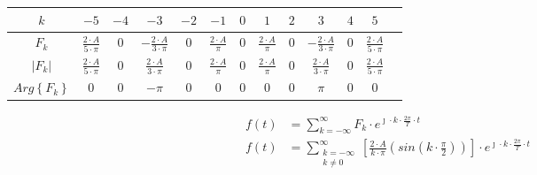 \begin{task}
\begin{table}[H]
    \centering  
    \begin{tabular}{|c|c|c|c|c|c|c|c|c|c|c|c|c|}
        \hline 
        $k$ & $-5$ & $-4$ & $-3$ & $-2$ & $-1$ & $0$ & $1$ & $2$ & $3$ & $4$ & $5$\\ 
        \hline 
        $F_k$ & $\frac{2\cdot A}{5 \cdot \pi}$ & $0$ & $-\frac{2\cdot A}{3 \cdot \pi}$ & $0$ & $\frac{2\cdot A}{\pi}$ & $0$ & $\frac{2\cdot A}{\pi}$ & $0$ & $-\frac{2 \cdot A}{3 \cdot \pi}$ & $0$ & $\frac{2\cdot A}{5 \cdot \pi}$\\ 
        \hline 
        $\left| F_k \right|$ & $\frac{2\cdot A}{5 \cdot \pi}$ & $0$ & $\frac{2\cdot A}{3 \cdot \pi}$ & $0$ & $\frac{2\cdot A}{\pi}$ & $0$ & $\frac{2\cdot A}{\pi}$ & $0$ & $\frac{2 \cdot A}{3 \cdot \pi}$ & $0$ & $\frac{2\cdot A}{5 \cdot \pi}$\\
        \hline
        $Arg\left\{ F_k \right\}$ & $0$ & $0$ & $-\pi$ & $0$ & $0$ & $0$ & $0$ & $0$ & $\pi$ & $0$ & $0$\\
        \hline
    \end{tabular} 
\end{table}


\begin{equation}
\begin{aligned}
f(t) &= \sum_{k=-\infty}^{\infty} F_k \cdot e^{\jmath \cdot k \cdot \frac{2\pi}{T} \cdot t}\\
f(t) &= \sum_{\begin{smallmatrix}k=-\infty \\ k \neq 0 \end{smallmatrix}}^{\infty} \left[\frac{2 \cdot A}{k\cdot \pi}\left( sin \left(k \cdot \frac{\pi}{2}\right)\right)\right] \cdot e^{\jmath \cdot k \cdot \frac{2\pi}{T} \cdot t}\\
\end{aligned}
\end{equation}



\end{task}
